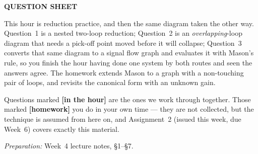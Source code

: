\documentclass[11pt,a4paper]{article}
\newif\ifsolutions
\begin{document}
\weektitle

\begin{center}
\ifsolutions
  {\large\sffamily\bfseries\color{fflag}QUESTIONS AND SOLUTIONS}\\[2pt]
  {\small\itshape Instructor copy --- do not circulate before the tutorial.}
\else
  {\large\sffamily\bfseries\color{fnavy}QUESTION SHEET}
\fi
\end{center}

\bigskip
\noindent
This hour is reduction practice, and then the same diagram taken the other
way. Question~1 is a nested two-loop reduction; Question~2 is an
\emph{overlapping}-loop diagram that needs a pick-off point moved before it
will collapse; Question~3 converts that same diagram to a signal flow graph and
evaluates it with Mason's rule, so you finish the hour having done one system
by both routes and seen the answers agree. The homework extends Mason to a
graph with a non-touching pair of loops, and revisits the canonical form with
an unknown gain.

\smallskip
\noindent
Questions marked \textbf{\color{faccent}[in the hour]} are the ones we work
through together. Those marked \textbf{\color{fflag}[homework]} you do in your
own time --- they are not collected, but the technique is assumed from here on,
and Assignment~2 (issued this week, due Week~6) covers exactly this material.

\smallskip
\noindent
\emph{Preparation:} Week~4 lecture notes, \S1--\S7.
\end{document}
